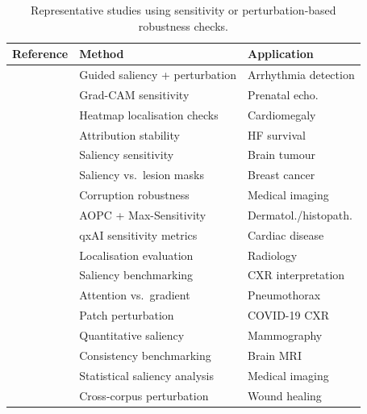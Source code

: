 \begin{table}[htbp]
\centering
\caption{Representative studies using sensitivity or perturbation-based robustness checks.}
\label{tab:sensitivity_methods}
\small
\begin{tabularx}{\columnwidth}{@{}p{1.8cm}XX@{}}
\toprule
\textbf{Reference} & \textbf{Method} & \textbf{Application} \\
\midrule
\cite{Zhang2021} & Guided saliency + perturbation & Arrhythmia detection \\
\cite{Nurmaini2022} & Grad-CAM sensitivity & Prenatal echo. \\
\cite{Lee2021Cardiomegaly} & Heatmap localisation checks & Cardiomegaly \\
\cite{MorenoSanchez2023} & Attribution stability & HF survival \\
\cite{Chmiel2023} & Saliency sensitivity & Brain tumour \\
\cite{Pertuz2023} & Saliency vs.\ lesion masks & Breast cancer \\
\cite{Repetto2025EvaluatingTR} & Corruption robustness & Medical imaging \\
\cite{Patricio2024} & AOPC + Max-Sensitivity & Dermatol./histopath. \\
\cite{Pandey2024} & qxAI sensitivity metrics & Cardiac disease \\
\cite{arun2021assessing} & Localisation evaluation & Radiology \\
\cite{saporta2022benchmarking} & Saliency benchmarking & CXR interpretation \\
\cite{wollek2023attention} & Attention vs.\ gradient & Pneumothorax \\
\cite{sun2023improving} & Patch perturbation & COVID-19 CXR \\
\cite{cerekci2024quantitative} & Quantitative saliency & Mammography \\
\cite{qin2025consistency} & Consistency benchmarking & Brain MRI \\
\cite{brima2024saliency} & Statistical saliency analysis & Medical imaging \\
\cite{jacob2025indian} & Cross-corpus perturbation & Wound healing \\
\bottomrule
\end{tabularx}
\end{table}

